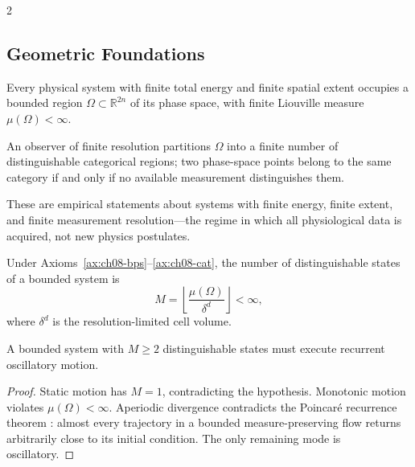 \begin{multicols}{2}
\subsection{Geometric Foundations}

\begin{axiom}
\label{ax:ch08-bps}
Every physical system with finite total energy and finite spatial extent occupies a bounded region $\Omega \subset \mathbb{R}^{2n}$ of its phase space, with finite Liouville measure $\mu(\Omega) < \infty$.
\end{axiom}

\begin{axiom}
\label{ax:ch08-cat}
An observer of finite resolution partitions $\Omega$ into a finite number of distinguishable categorical regions; two phase-space points belong to the same category if and only if no available measurement distinguishes them.
\end{axiom}

These are empirical statements about systems with finite energy, finite extent, and finite measurement resolution---the regime in which all physiological data is acquired, not new physics postulates.

\begin{theorem}
\label{thm:ch08-forced}
Under Axioms~\ref{ax:ch08-bps}--\ref{ax:ch08-cat}, the number of distinguishable states of a bounded system is
\begin{equation}
M = \left\lfloor \frac{\mu(\Omega)}{\delta^d} \right\rfloor < \infty,
\label{eq:ch08-M}
\end{equation}
where $\delta^d$ is the resolution-limited cell volume.
\end{theorem}

\begin{theorem}
\label{thm:ch08-oscillatory}
A bounded system with $M \geq 2$ distinguishable states must execute recurrent oscillatory motion.
\end{theorem}

\begin{proof}
Static motion has $M = 1$, contradicting the hypothesis. Monotonic motion violates $\mu(\Omega) < \infty$. Aperiodic divergence contradicts the Poincar\'{e} recurrence theorem \citep{poincare1890}: almost every trajectory in a bounded measure-preserving flow returns arbitrarily close to its initial condition. The only remaining mode is oscillatory.
\end{proof}


\end{multicols}
